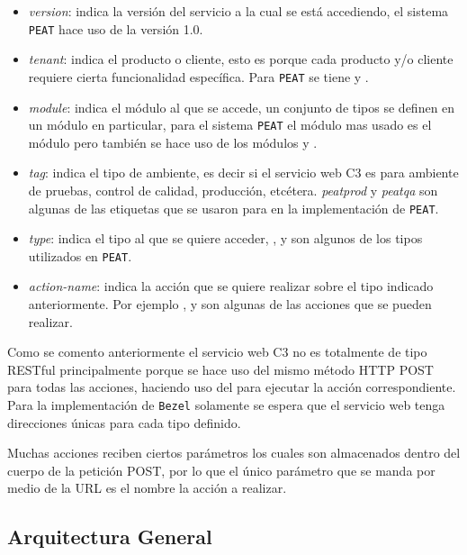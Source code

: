 \begin{itemize}
\item \textit{version}: indica la versión del servicio a la cual se está accediendo,
  el sistema \texttt{PEAT} hace uso de la versión 1.0.
\item \textit{tenant}: indica el producto o cliente, esto es porque cada
  producto y/o cliente requiere cierta funcionalidad específica. Para \texttt{PEAT}
  se tiene  y .
\item \textit{module}: indica el módulo al que se accede, un conjunto
  de tipos se definen en un módulo en particular, para el sistema \texttt{PEAT} el
  módulo mas usado es el módulo  pero también se hace uso
  de los módulos  y .
\item \textit{tag}: indica el tipo de ambiente, es decir si el servicio web C3 es
  para ambiente de pruebas, control de calidad, producción, etcétera.
  \textit{peatprod} y \textit{peatqa} son algunas de las etiquetas que se usaron
  para en la implementación de \texttt{PEAT}.
\item \textit{type}: indica el tipo al que se quiere acceder, ,
   y  son algunos
  de los tipos utilizados en \texttt{PEAT}.
\item \textit{action-name}: indica la acción que se quiere realizar sobre
  el tipo indicado anteriormente. Por ejemplo ,  y
   son algunas de las acciones que se pueden realizar.
\end{itemize}

Como se comento anteriormente el servicio web C3 no es totalmente de tipo RESTful
principalmente porque se hace uso del mismo método HTTP POST para todas las acciones,
haciendo uso del  para ejecutar la acción correspondiente.
Para la implementación de \texttt{Bezel} solamente se espera que el servicio web
tenga direcciones únicas para cada tipo definido.

Muchas acciones reciben ciertos parámetros los cuales son almacenados dentro del
cuerpo de la petición POST, por lo que el único parámetro que se manda por medio
de la URL es el nombre la acción a realizar.

\subsection{Arquitectura General}

